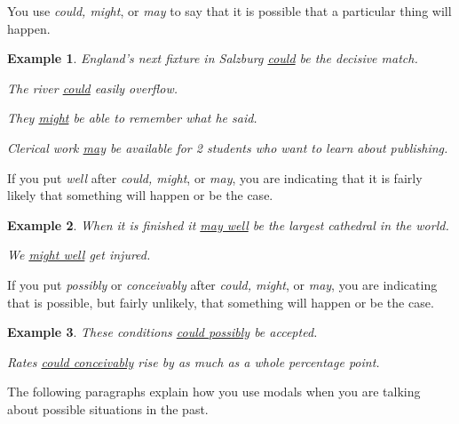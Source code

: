 \documentclass[oneside]{book}
\numberwithin{equation}{section}
\newtheorem{example}{Example}[section]
\begin{document}
%
\noindent{} You use \textit{could, might}, or \textit{may} to say that it is possible that a particular thing will happen.
\begin{example}
    England's next fixture in Salzburg \underline{could} be the decisive match.
    
    The river \underline{could} easily overflow.
    
    They \underline{might} be able to remember what he said.
    
    Clerical work \underline{may} be available for 2 students who want to learn about publishing.
\end{example}
If you put \textit{well} after \textit{could, might}, or \textit{may}, you are indicating that it is fairly likely that something will happen or be the case.
\begin{example}
    When it is finished it \underline{may well} be the largest cathedral in the world.
    
    We \underline{might well} get injured.
\end{example}
If you put \textit{possibly} or \textit{conceivably} after \textit{could, might}, or \textit{may}, you are indicating that is possible, but fairly unlikely, that something will happen or be the case.
\begin{example}
    These conditions \underline{could possibly} be accepted.
    
    Rates \underline{could conceivably} rise by as much as a whole percentage point.
\end{example}
%
\noindent{} The following paragraphs explain how you use modals when you are talking about possible situations in the past.
\end{document}
